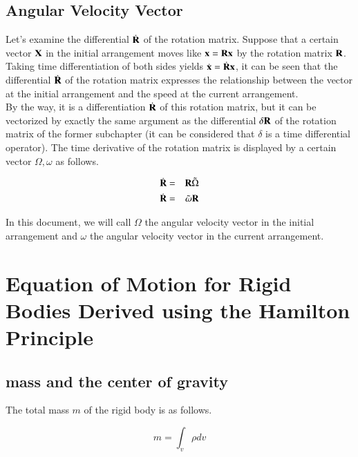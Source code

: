 \subsection{Angular Velocity Vector}

Let's examine the differential $\dot{\mathbf{R}}$ of the rotation matrix. Suppose that a certain vector $\mathbf{X}$ in the initial arrangement moves like $\mathbf{x}=\mathbf{R}\mathbf{x}$ by the rotation matrix $\mathbf{R}$. Taking time differentiation of both sides yields $\dot{\mathbf{x}}=\dot{\mathbf{R}}\mathbf{x}$, it can be seen that the differential $\dot{\mathbf{R}}$ of the rotation matrix expresses the relationship between the vector at the initial arrangement and the speed at the current arrangement. \\

By the way, it is a differentiation $\dot{\mathbf{R}}$ of this rotation matrix, but it can be vectorized by exactly the same argument as the differential $\delta\mathbf{R}$ of the rotation matrix of the former subchapter (it can be considered that $\delta$ is a time differential operator). The time derivative of the rotation matrix is ​​displayed by a certain vector $\Omega,\omega$ as follows.

\begin{tcolorbox}[title=two vector notation of rate of rotation change]
\begin{eqnarray}
\dot{\mathbf{R}} &=& \mathbf{R}\tilde{\Omega}\\
\dot{\mathbf{R}} &=& \tilde{\omega}\mathbf{R}
\end{eqnarray}
\end{tcolorbox}


In this document, we will call $\Omega$ the angular velocity vector in the initial arrangement and $\omega$ the angular velocity vector in the current arrangement.


\section{Equation of Motion for Rigid Bodies Derived using the Hamilton Principle}

\subsection{mass and the center of gravity}

The total mass $m$ of the rigid body is as follows.

\begin{equation}
m = \int_v \rho dv
\end{equation}

